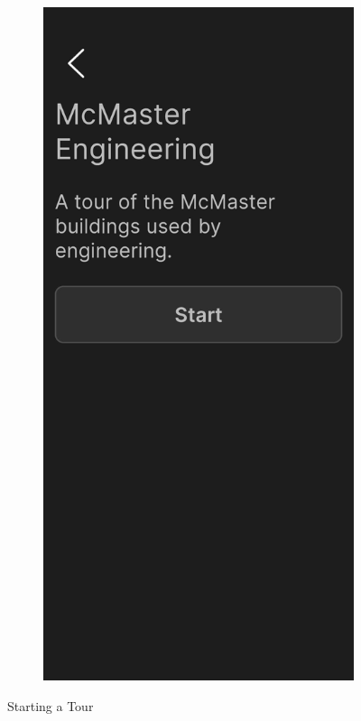 \documentclass[12pt, titlepage]{article}
\begin{document}
\begin{figure}[ht!]
\begin{subfigure}[b]{0.48\textwidth}
    \end{subfigure}
    \hfill
    \begin{subfigure}[b]{0.48\textwidth}
        \centering
        \includegraphics[width=\textwidth]{start_tour.png}
    \end{subfigure}
    \caption{Starting a Tour}
    \label{fig:tourview1}
\end{figure}
\end{document}
